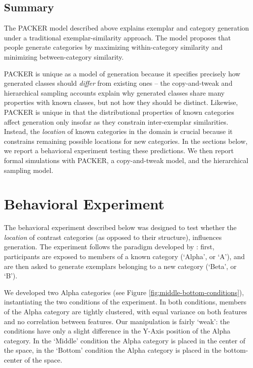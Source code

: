 \documentclass[10pt,letterpaper]{article}
\begin{document}
\subsection{Summary}

The PACKER model described above explains exemplar and category generation under a traditional exemplar-similarity approach. The model proposes that people generate categories by maximizing within-category similarity and minimizing between-category similarity. 

PACKER is unique as a model of generation because it specifies precisely how generated classes should \textit{differ} from existing ones -- the copy-and-tweak and hierarchical sampling accounts explain why generated classes share many properties with known classes, but not how they should be distinct. Likewise, PACKER is unique in that the distributional properties of known categories affect generation only insofar as they constrain inter-exemplar similarities. Instead, the \textit{location} of known categories in the domain is crucial because it constrains remaining possible locations for new categories. In the sections below, we report a behavioral experiment testing these predictions. We then report formal simulations with PACKER, a copy-and-tweak model, and the \citet{jern2013probabilistic} hierarchical sampling model. 


\section{Behavioral Experiment}

The behavioral experiment described below was designed to test whether the \textit{location} of contrast categories (as opposed to their structure), influences generation. The experiment follows the paradigm developed by \citet{jern2013probabilistic}: first, participants are exposed to members of a known category (`Alpha', or `A'), and are then asked to generate exemplars belonging to a new category (`Beta', or `B'). 

We developed two Alpha categories (see Figure \ref{fig:middle-bottom-conditions}), instantiating the two conditions of the experiment. In both conditions, members of the Alpha category are tightly clustered, with equal variance on both features and no correlation between features. Our manipulation is fairly `weak': the conditions have only a slight difference in the Y-Axis position of the Alpha category. In the `Middle' condition the Alpha category is placed in the center of the space, in the `Bottom' condition the Alpha category is placed in the bottom-center of the space. 
\end{document}
